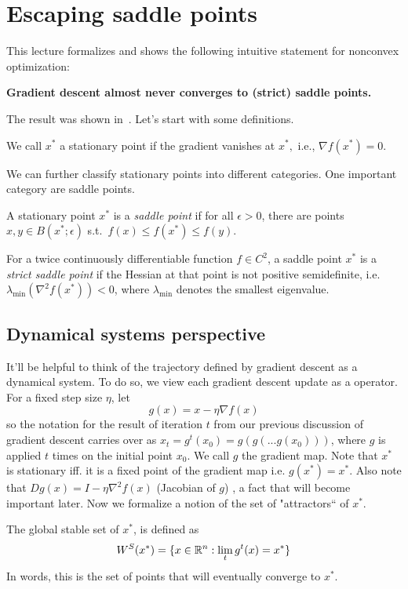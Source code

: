 \section{Escaping saddle points} 

This lecture formalizes and shows the following intuitive statement for
nonconvex optimization:
\begin{center}
	\textbf{Gradient descent almost never converges to (strict) saddle points.}
\end{center}
The result was shown in~\cite{lee2016gradient}. Let's start with some definitions.

\begin{definition}
We call $x^*$ a stationary point if the gradient vanishes at $x^*,$ i.e., 
$\nabla f(x^*) = 0$. 
\end{definition}

We can further classify stationary points into different categories. One
important category are saddle points.

\begin{definition}
A stationary point $x^*$ is a \emph{saddle point} 
if for all $\epsilon>0$,  there are points $x,y \in B(x^*;\epsilon)$ 
s.t.~$f(x)\leq f(x^*)\leq f(y)$.
\end{definition}

\begin{definition}
For a twice continuously differentiable function $f\in C^2$, a saddle point
$x^*$ is a \emph{strict saddle point} if the Hessian at that point is not
positive semidefinite, i.e.  $\lambda_{\text{min}}(\nabla^2 f(x^*)) < 0$, where
$\lambda_{\text{min}}$ denotes the smallest eigenvalue.
\end{definition}

\subsection{Dynamical systems perspective}

It'll be helpful to think of the trajectory defined by gradient descent as a
dynamical system.
To do so, we view each gradient descent update as a operator.  
For a fixed step size $\eta$, let
$$
g(x) = x-\eta\nabla f(x)
$$ 
so the notation for the result of iteration $t$ from our previous discussion of gradient descent carries over as $x_t = g^t(x_0) = g(g(...g(x_0)))$, where $g$ is applied $t$ times on the initial point $x_0$. We call $g$ the gradient map. Note that $x^*$ is stationary iff. it is a fixed point of the gradient map i.e. $g(x^*) = x^*$. Also note that
$D g(x) = I - \eta\nabla^2 f(x)$ (Jacobian of $g$) , a fact that will become important later. Now we formalize a notion of the set of "attractors`` of $x^*$.
\begin{definition}
The global stable set of $x^*$, is defined as
$$
W^S(x^*) = \{ x\in\mathbb{R}^n: \lim_{t} g^t(x) = x^* \}
$$
In words, this is the set of points that will eventually converge to $x^*$.
\end{definition}

